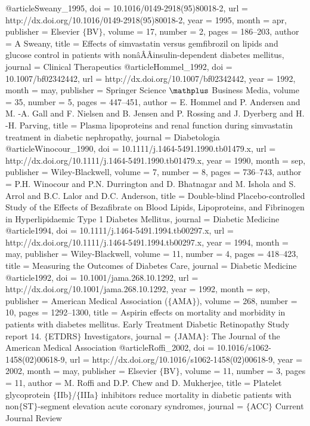 @article{Sweany_1995,
	doi = {10.1016/0149-2918(95)80018-2},
	url = {http://dx.doi.org/10.1016/0149-2918(95)80018-2},
	year = 1995,
	month = {apr},
	publisher = {Elsevier $\lbrace$BV$\rbrace$},
	volume = {17},
	number = {2},
	pages = {186--203},
	author = {A Sweany},
	title = {Effects of simvastatin versus gemfibrozil on lipids and glucose control in patients with non{\^{a}}ÂÂinsulin-dependent diabetes mellitus},
	journal = {Clinical Therapeutics}
}
@article{Hommel_1992,
	doi = {10.1007/bf02342442},
	url = {http://dx.doi.org/10.1007/bf02342442},
	year = 1992,
	month = {may},
	publisher = {Springer Science $\mathplus$ Business Media},
	volume = {35},
	number = {5},
	pages = {447--451},
	author = {E. Hommel and P. Andersen and M. -A. Gall and F. Nielsen and B. Jensen and P. Rossing and J. Dyerberg and H. -H. Parving},
	title = {Plasma lipoproteins and renal function during simvastatin treatment in diabetic nephropathy},
	journal = {Diabetologia}
}
@article{Winocour_1990,
	doi = {10.1111/j.1464-5491.1990.tb01479.x},
	url = {http://dx.doi.org/10.1111/j.1464-5491.1990.tb01479.x},
	year = 1990,
	month = {sep},
	publisher = {Wiley-Blackwell},
	volume = {7},
	number = {8},
	pages = {736--743},
	author = {P.H. Winocour and P.N. Durrington and D. Bhatnagar and M. Ishola and S. Arrol and B.C. Lalor and D.C. Anderson},
	title = {Double-blind Placebo-controlled Study of the Effects of Bezafibrate on Blood Lipids, Lipoproteins, and Fibrinogen in Hyperlipidaemic Type 1 Diabetes Mellitus},
	journal = {Diabetic Medicine}
}
@article{1994,
	doi = {10.1111/j.1464-5491.1994.tb00297.x},
	url = {http://dx.doi.org/10.1111/j.1464-5491.1994.tb00297.x},
	year = 1994,
	month = {may},
	publisher = {Wiley-Blackwell},
	volume = {11},
	number = {4},
	pages = {418--423},
	title = {Measuring the Outcomes of Diabetes Care},
	journal = {Diabetic Medicine}
}
@article{1992,
	doi = {10.1001/jama.268.10.1292},
	url = {http://dx.doi.org/10.1001/jama.268.10.1292},
	year = 1992,
	month = {sep},
	publisher = {American Medical Association ($\lbrace$AMA$\rbrace$)},
	volume = {268},
	number = {10},
	pages = {1292--1300},
	title = {Aspirin effects on mortality and morbidity in patients with diabetes mellitus. Early Treatment Diabetic Retinopathy Study report 14. $\lbrace$ETDRS$\rbrace$ Investigators},
	journal = {$\lbrace$JAMA$\rbrace$: The Journal of the American Medical Association}
}
@article{Roffi_2002,
	doi = {10.1016/s1062-1458(02)00618-9},
	url = {http://dx.doi.org/10.1016/s1062-1458(02)00618-9},
	year = 2002,
	month = {may},
	publisher = {Elsevier $\lbrace$BV$\rbrace$},
	volume = {11},
	number = {3},
	pages = {11},
	author = {M. Roffi and D.P. Chew and D. Mukherjee},
	title = {Platelet glycoprotein $\lbrace$IIb$\rbrace$/$\lbrace$IIIa$\rbrace$ inhibitors reduce mortality in diabetic patients with non{\textendash}$\lbrace$ST$\rbrace$-segment elevation acute coronary syndromes},
	journal = {$\lbrace$ACC$\rbrace$ Current Journal Review}
}
